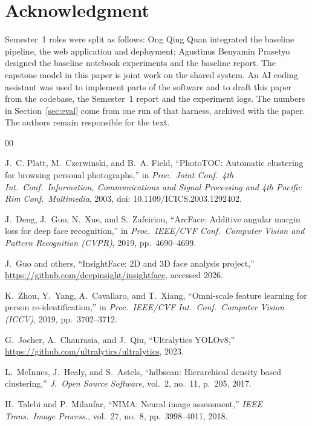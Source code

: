 \documentclass[conference]{IEEEtran}
\begin{document}
\section*{Acknowledgment}
Semester~1 roles were split as follows: Ong Qing Quan integrated the baseline
pipeline, the web application and deployment; Agustinus Benyamin Prasetyo
designed the baseline notebook experiments and the baseline report. The
capstone model in this paper is joint work on the shared system. An AI coding
assistant was used to implement parts of the software and to draft this paper
from the codebase, the Semester~1 report and the experiment logs. The numbers
in Section~\ref{sec:eval} come from one run of that harness, archived with the
paper. The authors remain responsible for the text.

\balance
\begin{thebibliography}{00}

J.~C. Platt, M.~Czerwinski, and B.~A. Field,
``PhotoTOC: Automatic clustering for browsing personal photographs,''
in \emph{Proc.\ Joint Conf.\ 4th Int.\ Conf.\ Information, Communications
and Signal Processing and 4th Pacific Rim Conf.\ Multimedia},
2003, doi: 10.1109/ICICS.2003.1292402.

J.~Deng, J.~Guo, N.~Xue, and S.~Zafeiriou,
``ArcFace: Additive angular margin loss for deep face recognition,''
in \emph{Proc.\ IEEE/CVF Conf.\ Computer Vision and Pattern Recognition (CVPR)},
2019, pp.~4690--4699.

J.~Guo and others,
``InsightFace: 2D and 3D face analysis project,''
\url{https://github.com/deepinsight/insightface}, accessed 2026.

K.~Zhou, Y.~Yang, A.~Cavallaro, and T.~Xiang,
``Omni-scale feature learning for person re-identification,''
in \emph{Proc.\ IEEE/CVF Int.\ Conf.\ Computer Vision (ICCV)},
2019, pp.~3702--3712.

G.~Jocher, A.~Chaurasia, and J.~Qiu,
``Ultralytics YOLOv8,''
\url{https://github.com/ultralytics/ultralytics}, 2023.

L.~McInnes, J.~Healy, and S.~Astels,
``hdbscan: Hierarchical density based clustering,''
\emph{J.\ Open Source Software}, vol.~2, no.~11, p.~205, 2017.

H.~Talebi and P.~Milanfar,
``NIMA: Neural image assessment,''
\emph{IEEE Trans.\ Image Process.}, vol.~27, no.~8, pp.~3998--4011, 2018.


\end{thebibliography}
\end{document}
